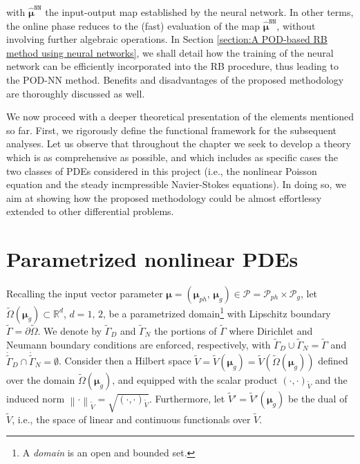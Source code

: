 \documentclass[12pt, a4paper, twoside, openright]{report}
\numberwithin{equation}{chapter}
\theoremstyle{theorem}
\theoremstyle{definition}
\theoremstyle{remark}
\theoremstyle{proposition}
\numberwithin{figure}{chapter}
\newcommand{\norm}[1]{\left\lVert#1\right\rVert}
\newcommand{\wt}[1]{\widetilde{#1}}
\newcommand{\bg}[1]{\boldsymbol{#1}}
\begin{document}
		with $\hat{\bg{\mu}}^{\texttt{NN}}$ the input-output map established by the neural network. In other terms, the online phase reduces to the (fast) evaluation of the map $\hat{\bg{\mu}}^{\texttt{NN}}$, without involving further algebraic operations. In Section \ref{section:A POD-based RB method using neural networks}, we shall detail how the training of the neural network can be efficiently incorporated into the RB procedure, thus leading to the POD-NN method. Benefits and disadvantages of the proposed methodology are thoroughly discussed as well.
		
		\vspace*{0.3cm}
		
		We now proceed with a deeper theoretical presentation of the elements mentioned so far. First, we rigorously define the functional framework for the subsequent analyses. Let us observe that throughout the chapter we seek to develop a theory which is as comprehensive as possible, and which includes as specific cases the two classes of PDEs considered in this project (i.e., the nonlinear Poisson equation and the steady incmpressible Navier-Stokes equations). In doing so, we aim at showing how the proposed methodology could be almost effortlessy extended to other differential problems.
		
	\vspace*{0.3cm}
		
	\section{Parametrized nonlinear PDEs}
	\label{section:Parametrized nonlinear PDEs}
	
		Recalling the input vector parameter $\bg{\mu} = (\bg{\mu}_{ph}, \, \bg{\mu}_g) \in \mathcal{P} = \mathcal{P}_{ph} \times \mathcal{P}_g$, let $\wt{\Omega}(\boldsymbol{\mu}_g) \subset \mathbb{R}^d$, $d = 1, \, 2$, be a parametrized domain\footnote{A \emph{domain} is an open and bounded set.} with Lipschitz boundary $\wt{\Gamma} = \partial \wt{\Omega}$. We denote by $\wt{\Gamma}_D$ and $\wt{\Gamma}_N$ the portions of $\wt{\Gamma}$ where Dirichlet and Neumann boundary conditions are enforced, respectively, with $\wt{\Gamma}_D \cup \wt{\Gamma}_N = \wt{\Gamma}$ and $\mathring{\wt{\Gamma}}_D \cap \mathring{\wt{\Gamma}}_N = \emptyset$. Consider then a Hilbert space $\wt{V} = \wt{V}(\bg{\mu}_g) = \wt{V}(\wt{\Omega}(\boldsymbol{\mu}_g))$ defined over the domain $\wt{\Omega}(\boldsymbol{\mu}_g)$, and equipped with the scalar product $(\cdot,\cdot)_{\wt{V}}$ and the induced norm $\norm{\cdot}_{\wt{V}} = \sqrt{(\cdot,\cdot)_{\wt{V}}}$. Furthermore, let $\wt{V}' = \wt{V}'(\boldsymbol{\mu}_g)$ be the dual of $\wt{V}$, i.e., the space of linear and continuous functionals over $\wt{V}$.
		
\end{document}
